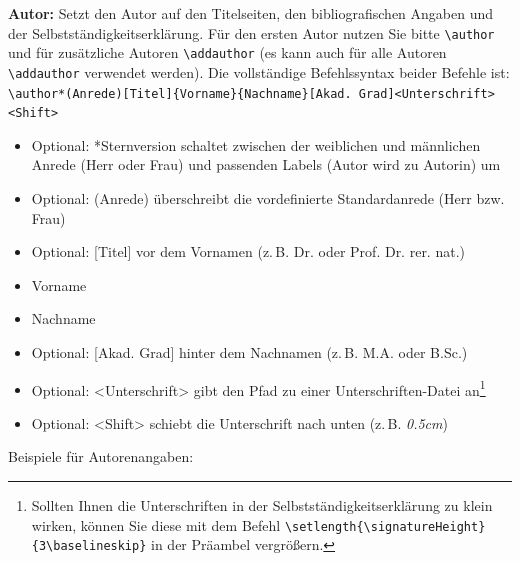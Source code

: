 	\textbf{Autor:}\label{cmd:author}
	Setzt den Autor auf den Titelseiten, den bibliografischen Angaben und der Selbstständigkeitserklärung.
	Für den ersten Autor nutzen Sie bitte \verb|\author| und für zusätzliche Autoren \verb|\addauthor| (es kann auch für alle Autoren \verb|\addauthor| verwendet werden).
	Die vollständige Befehlssyntax beider Befehle ist:
	\newline
	{\small\verb|\author*(Anrede)[Titel]{Vorname}{Nachname}[Akad. Grad]<Unterschrift><Shift>|}
	\begin{itemize}
		\item Optional: *Sternversion schaltet zwischen der weiblichen und männlichen Anrede (Herr oder Frau) und passenden Labels (Autor wird zu Autorin) um
		\item Optional: (Anrede) überschreibt die vordefinierte Standardanrede (Herr bzw. Frau)
		\item Optional: [Titel] vor dem Vornamen (z.\,B. Dr. oder Prof. Dr. rer. nat.)
		\item Vorname
		\item Nachname
		\item Optional: [Akad. Grad] hinter dem Nachnamen (z.\,B. M.A. oder B.Sc.)
		\item Optional: <Unterschrift> gibt den Pfad zu einer Unterschriften-Datei an\footnote{Sollten Ihnen die Unterschriften in der Selbstständigkeitserklärung zu klein wirken, können Sie diese mit dem Befehl \texttt{\textbackslash{}setlength\{\textbackslash{}signatureHeight\}\{3\textbackslash{}baselineskip\}} in der Präambel vergrößern.}
		\item Optional: <Shift> schiebt die Unterschrift nach unten (z.\,B. \textit{0.5cm})
	\end{itemize}\vspace*{-\baselineskip}
	Beispiele für Autorenangaben:
